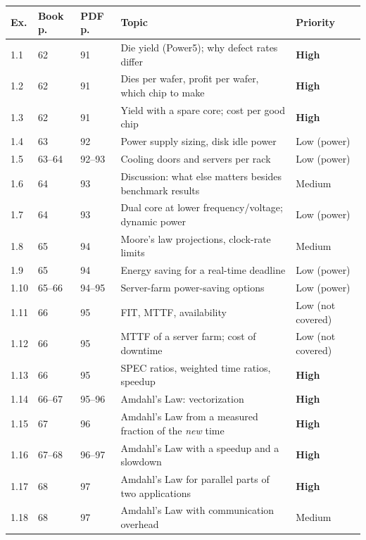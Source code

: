 \documentclass[11pt]{article}
\begin{document}
\begin{center}
\small
\renewcommand{\arraystretch}{1.15}
\begin{tabular}{@{}lll>{\raggedright\arraybackslash}p{5.3cm}l@{}}
\toprule
Ex. & Book p. & PDF p. & Topic & Priority \\
\midrule
1.1 & 62 & 91 & Die yield (Power5); why defect rates differ & \textbf{High} \\
1.2 & 62 & 91 & Dies per wafer, profit per wafer, which chip to make & \textbf{High} \\
1.3 & 62 & 91 & Yield with a spare core; cost per good chip & \textbf{High} \\
1.4 & 63 & 92 & Power supply sizing, disk idle power & Low (power) \\
1.5 & 63--64 & 92--93 & Cooling doors and servers per rack & Low (power) \\
1.6 & 64 & 93 & Discussion: what else matters besides benchmark results & Medium \\
1.7 & 64 & 93 & Dual core at lower frequency/voltage; dynamic power & Low (power) \\
1.8 & 65 & 94 & Moore's law projections, clock-rate limits & Medium \\
1.9 & 65 & 94 & Energy saving for a real-time deadline & Low (power) \\
1.10 & 65--66 & 94--95 & Server-farm power-saving options & Low (power) \\
1.11 & 66 & 95 & FIT, MTTF, availability & Low (not covered) \\
1.12 & 66 & 95 & MTTF of a server farm; cost of downtime & Low (not covered) \\
1.13 & 66 & 95 & SPEC ratios, weighted time ratios, speedup & \textbf{High} \\
1.14 & 66--67 & 95--96 & Amdahl's Law: vectorization & \textbf{High} \\
1.15 & 67 & 96 & Amdahl's Law from a measured fraction of the \emph{new} time & \textbf{High} \\
1.16 & 67--68 & 96--97 & Amdahl's Law with a speedup and a slowdown & \textbf{High} \\
1.17 & 68 & 97 & Amdahl's Law for parallel parts of two applications & \textbf{High} \\
1.18 & 68 & 97 & Amdahl's Law with communication overhead & Medium \\
\bottomrule
\end{tabular}
\end{center}
\end{document}
